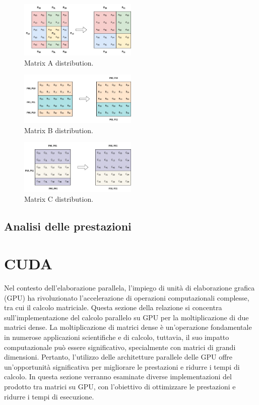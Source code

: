 \documentclass[conference]{IEEEtran}
\begin{document}
\begin{figure}
    \centering
    \includegraphics[width=0.5\textwidth]{resources/matrixA_2d_block_cyclic_distribution.jpg}
    \caption{Matrix A distribution.}
    \label{fig:matrix_a_distribution}
\end{figure}
\begin{figure}
    \centering
    \includegraphics[width=0.5\textwidth]{resources/matrixB_row_block_cyclic_distribution.jpg}
    \caption{Matrix B distribution.}
    \label{fig:matrix_b_distribution}
\end{figure}
\begin{figure}
    \centering
    \includegraphics[width=0.5\textwidth]{resources/matrixC_row_block_cyclic_distribution.jpg}
    \caption{Matrix C distribution.}
    \label{fig:matrix_c_distribution}
\end{figure}
\subsection{Analisi delle prestazioni}

\section{CUDA}
Nel contesto dell'elaborazione parallela, l'impiego di unità di elaborazione grafica (GPU) ha rivoluzionato l'accelerazione di operazioni computazionali complesse, tra cui il calcolo matriciale. Questa sezione della relazione si concentra sull'implementazione del calcolo parallelo su GPU per la moltiplicazione di due matrici dense. La moltiplicazione di matrici dense è un'operazione fondamentale in numerose applicazioni scientifiche e di calcolo, tuttavia, il suo impatto computazionale può essere significativo, specialmente con matrici di grandi dimensioni. Pertanto, l'utilizzo delle architetture parallele delle GPU offre un'opportunità significativa per migliorare le prestazioni e ridurre i tempi di calcolo. In questa sezione verranno esaminate diverse implementazioni del prodotto tra matrici su GPU, con l'obiettivo di ottimizzare le prestazioni e ridurre i tempi di esecuzione.
\end{document}
